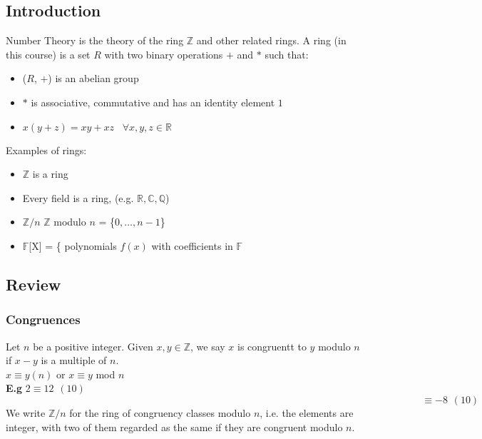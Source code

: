 \documentclass[11pt]{article}
\begin{document}
	\subsection{Introduction}
	Number Theory is the theory of the ring $\mathbb{Z}$ and other related rings. A ring (in this course) is a set $R$ with two binary operations $+$ and $*$ such that:
	\begin{itemize}
		\item ($R$, $+$) is an abelian group
		\item $*$ is associative, commutative and has an identity element $1$
		\item $x(y+z) = xy + xz \hspace{10pt} \forall x,y,z \in \mathbb{R} $

	\end{itemize}
Examples of rings:
	\begin{itemize}
		\item $\mathbb{Z}$ is a ring
		\item Every field is a ring, (e.g. $\mathbb{R}, \mathbb{C}, \mathbb{Q}$)
		\item $\mathbb{Z}/n$ \hspace{10pt} $\mathbb{Z}$ modulo $n$ = \{$0, \dots, n-1$\}
		\item $\mathbb{F}$[X] = \{ polynomials $f(x)$ with coefficients in $\mathbb{F}$


	\end{itemize}
	\subsection{Review}

	\subsubsection{Congruences}
	Let $n$ be a positive integer. Given $x,y \in \mathbb{Z}$, we say $x$ is congruentt to $y$ modulo $n$ if $x-y$ is a multiple of $n$.\\

	$x \equiv y (n)$  \hspace{10pt} or \hspace{10pt} $x \equiv y$ mod $n$\\[1em]
	\textbf{E.g} \hspace{10pt} $2 \equiv 12 \hspace{5pt} (10)$ \\
	 $ $ $ \hspace{500pt} \equiv -8 \hspace{5pt} (10)$\\[1em]
	We write $\mathbb{Z}/n$ for the ring of congruency classes modulo $n$, i.e. the elements are integer, with two of them regarded as the same if they are congruent modulo $n$.\\
\end{document}
